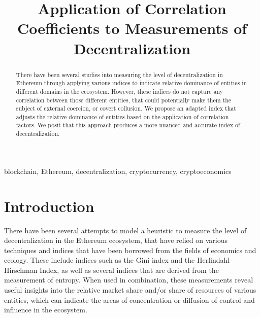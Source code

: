 \documentclass[conference]{IEEEtran}
\begin{document}
\title{Application of Correlation Coefficients to Measurements of Decentralization}

\author{
  \and
}

\maketitle

\begin{abstract}
There have been several studies into measuring the level of decentralization in Ethereum through applying various indices to indicate relative dominance of entities in different domains in the ecosystem.  However, these indices do not capture any correlation between those different entities, that could potentially make them the subject of external coercion, or covert collusion.  We propose an adapted index that adjusts the relative dominance of entities based on the application of correlation factors.  We posit that this approach produces a more nuanced and accurate index of decentralization.
\end{abstract}

\begin{IEEEkeywords}
blockchain, Ethereum, decentralization, cryptocurrency, cryptoeconomics
\end{IEEEkeywords}

\section{Introduction}

There have been several attempts to model a heuristic to measure the level of decentralization in the Ethereum ecosystem, that have relied on various techniques and indices that have been borrowed from the fields of economics and ecology.  These include indices such as the Gini index and the Herfindahl–Hirschman Index, as well as several indices that are derived from the measurement of entropy.  When used in combination, these measurements reveal useful insights into the relative market share and/or share of resources of various entities, which can indicate the areas of concentration or diffusion of control and influence in the ecosystem.
\end{document}
